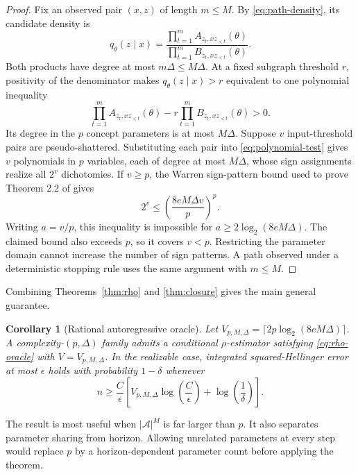 \documentclass[twoside]{article}
\newtheorem{corollary}[theorem]{Corollary}
\newcommand{\A}{\mathcal A}
\begin{document}
\begin{proof}
Fix an observed pair $(x,z)$ of length $m\leq M$. By \eqref{eq:path-density}, its candidate density is \[ q_\theta(z\mid x)= \frac{\prod_{t=1}^m A_{z_t,xz_{<t}}(\theta)} {\prod_{t=1}^m B_{z_t,xz_{<t}}(\theta)}. \] Both products have degree at most $m\Delta\leq M\Delta$. At a fixed subgraph threshold $r$, positivity of the denominator makes $q_\theta(z\mid x)>r$ equivalent to one polynomial inequality
\begin{equation}
 \prod_{t=1}^m A_{z_t,xz_{<t}}(\theta)
 -r\prod_{t=1}^m B_{z_t,xz_{<t}}(\theta)>0.
 \label{eq:polynomial-test}
\end{equation}
Its degree in the $p$ concept parameters is at most $M\Delta$. Suppose $v$ input-threshold pairs are pseudo-shattered. Substituting each pair into \eqref{eq:polynomial-test} gives $v$ polynomials in $p$ variables, each of degree at most $M\Delta$, whose sign assignments realize all $2^v$ dichotomies. If $v\geq p$, the Warren sign-pattern bound used to prove Theorem 2.2 of \citet{goldberg1995} gives \[ 2^v\leq\left(\frac{8eM\Delta v}{p}\right)^p. \] Writing $a=v/p$, this inequality is impossible for $a\geq2\log_2(8eM\Delta)$. The claimed bound also exceeds $p$, so it covers $v<p$. Restricting the parameter domain cannot increase the number of sign patterns. A path observed under a deterministic stopping rule uses the same argument with $m\leq M$.
\end{proof}

Combining Theorems~\ref{thm:rho} and \ref{thm:closure} gives the main general guarantee.

\begin{corollary}[Rational autoregressive oracle]
\label{cor:rational}
Let $V_{p,M,\Delta}=\lceil2p\log_2(8eM\Delta)\rceil$. A complexity-$(p,\Delta)$ family admits a conditional $\rho$-estimator satisfying \eqref{eq:rho-oracle} with $V=V_{p,M,\Delta}$. In the realizable case, integrated squared-Hellinger error at most $\epsilon$ holds with probability $1-\delta$ whenever
\begin{equation}
 n\geq\frac{C}{\epsilon}\left[V_{p,M,\Delta}\log\!\left(\frac C\epsilon\right)+\log\!\left(\frac1\delta\right)\right].
 \label{eq:sample-rational}
\end{equation}
\end{corollary}

The result is most useful when $|\A|^M$ is far larger than $p$. It also separates parameter sharing from horizon. Allowing unrelated parameters at every step would replace $p$ by a horizon-dependent parameter count before applying the theorem.
\end{document}
